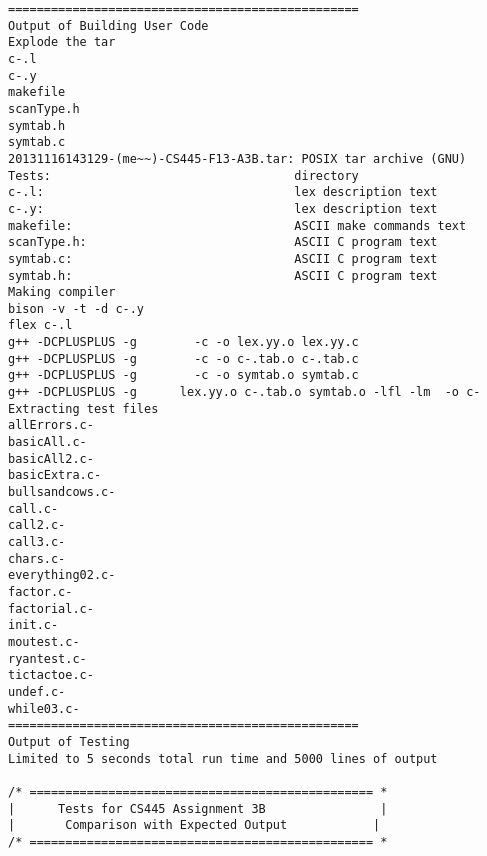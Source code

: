 \documentclass[12pt]{book}
\begin{document}
\begin{lstlisting}
=================================================
Output of Building User Code
Explode the tar
c-.l
c-.y
makefile
scanType.h
symtab.h
symtab.c
20131116143129-(me~~)-CS445-F13-A3B.tar: POSIX tar archive (GNU)
Tests:                                  directory
c-.l:                                   lex description text
c-.y:                                   lex description text
makefile:                               ASCII make commands text
scanType.h:                             ASCII C program text
symtab.c:                               ASCII C program text
symtab.h:                               ASCII C program text
Making compiler
bison -v -t -d c-.y  
flex c-.l
g++ -DCPLUSPLUS -g        -c -o lex.yy.o lex.yy.c
g++ -DCPLUSPLUS -g        -c -o c-.tab.o c-.tab.c
g++ -DCPLUSPLUS -g        -c -o symtab.o symtab.c
g++ -DCPLUSPLUS -g      lex.yy.o c-.tab.o symtab.o -lfl -lm  -o c- 
Extracting test files
allErrors.c-
basicAll.c-
basicAll2.c-
basicExtra.c-
bullsandcows.c-
call.c-
call2.c-
call3.c-
chars.c-
everything02.c-
factor.c-
factorial.c-
init.c-
moutest.c-
ryantest.c-
tictactoe.c-
undef.c-
while03.c-
=================================================
Output of Testing
Limited to 5 seconds total run time and 5000 lines of output

/* ================================================ *
|      Tests for CS445 Assignment 3B                |
|       Comparison with Expected Output            |
/* ================================================ *


\end{lstlisting}
\end{document}
